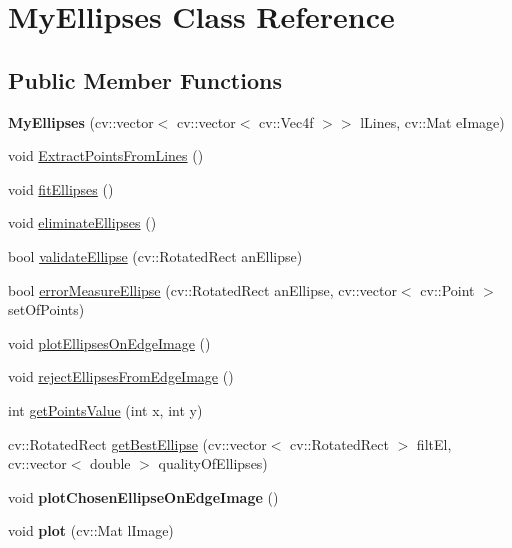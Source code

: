 \hypertarget{classMyEllipses}{
\section{MyEllipses Class Reference}
\label{classMyEllipses}
}
\subsection*{Public Member Functions}
\begin{DoxyCompactItemize}
\item 
\hypertarget{classMyEllipses_aebf082591d72e83462a75c569ed06bd1}{
{\bfseries MyEllipses} (cv::vector$<$ cv::vector$<$ cv::Vec4f $>$$>$ lLines, cv::Mat eImage)}
\label{classMyEllipses_aebf082591d72e83462a75c569ed06bd1}

\item 
void \hyperlink{classMyEllipses_ae3b80d1c6fa91ea4f79a248692221def}{ExtractPointsFromLines} ()
\item 
void \hyperlink{classMyEllipses_a2a70622b31382d0963636f1395431d8f}{fitEllipses} ()
\item 
void \hyperlink{classMyEllipses_a86c9f35038267eefb37377a564e19708}{eliminateEllipses} ()
\item 
bool \hyperlink{classMyEllipses_ab6caac8fbf9d5437ef23d28010049f54}{validateEllipse} (cv::RotatedRect anEllipse)
\item 
bool \hyperlink{classMyEllipses_a22d5aa9a9f25e43a05230de8b375e4ae}{errorMeasureEllipse} (cv::RotatedRect anEllipse, cv::vector$<$ cv::Point $>$ setOfPoints)
\item 
void \hyperlink{classMyEllipses_a5da32ae0839fbbeb68eb100bc6e1a957}{plotEllipsesOnEdgeImage} ()
\item 
void \hyperlink{classMyEllipses_ab67f344f29c74a3e59b32afcaa0e6547}{rejectEllipsesFromEdgeImage} ()
\item 
int \hyperlink{classMyEllipses_ae28837a96d0486b71aaf7796b34aae3f}{getPointsValue} (int x, int y)
\item 
cv::RotatedRect \hyperlink{classMyEllipses_a2e1afdde16509b2fe105fa9ecbd8e17c}{getBestEllipse} (cv::vector$<$ cv::RotatedRect $>$ filtEl, cv::vector$<$ double $>$ qualityOfEllipses)
\item 
\hypertarget{classMyEllipses_ad5304c2c7bc8a80ae31c657ebdd0577a}{
void {\bfseries plotChosenEllipseOnEdgeImage} ()}
\label{classMyEllipses_ad5304c2c7bc8a80ae31c657ebdd0577a}

\item 
\hypertarget{classMyEllipses_ad40475585a2d054876e1a65131bb3813}{
void {\bfseries plot} (cv::Mat lImage)}
\label{classMyEllipses_ad40475585a2d054876e1a65131bb3813}

\end{DoxyCompactItemize}

